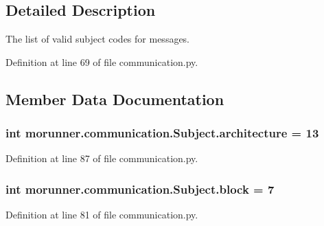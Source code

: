 \subsection{Detailed Description}
\begin{DoxyVerb}The list of valid subject codes for messages.
\end{DoxyVerb}
 

Definition at line 69 of file communication.\+py.



\subsection{Member Data Documentation}
\hypertarget{classmorunner_1_1communication_1_1Subject_ae8f2eb6f002dc62290238d42280975a0}{}
\subsubsection[{architecture}]{\setlength{\rightskip}{0pt plus 5cm}int morunner.\+communication.\+Subject.\+architecture = 13\hspace{0.3cm}{\ttfamily [static]}}\label{classmorunner_1_1communication_1_1Subject_ae8f2eb6f002dc62290238d42280975a0}


Definition at line 87 of file communication.\+py.

\hypertarget{classmorunner_1_1communication_1_1Subject_a4164b6a9955ed4dcd4710a50b28bbeac}{}
\subsubsection[{block}]{\setlength{\rightskip}{0pt plus 5cm}int morunner.\+communication.\+Subject.\+block = 7\hspace{0.3cm}{\ttfamily [static]}}\label{classmorunner_1_1communication_1_1Subject_a4164b6a9955ed4dcd4710a50b28bbeac}


Definition at line 81 of file communication.\+py.

\hypertarget{classmorunner_1_1communication_1_1Subject_a096a79c71387142b11d5d536bda224ef}{}
